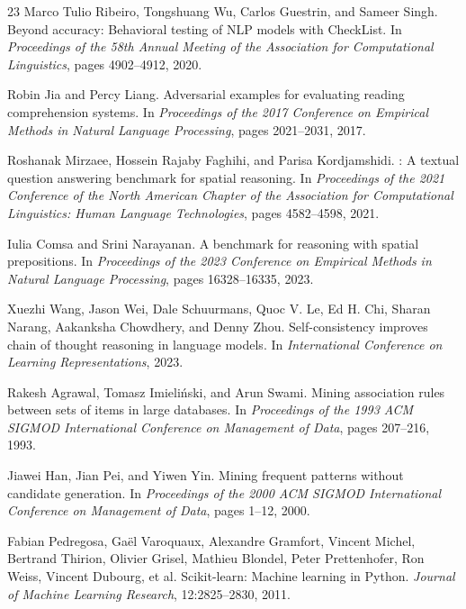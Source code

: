 \begin{thebibliography}{23}
Marco Tulio Ribeiro, Tongshuang Wu, Carlos Guestrin, and Sameer Singh.
\newblock Beyond accuracy: Behavioral testing of NLP models with CheckList.
\newblock In \emph{Proceedings of the 58th Annual Meeting of the Association for Computational Linguistics}, pages 4902--4912, 2020.

Robin Jia and Percy Liang.
\newblock Adversarial examples for evaluating reading comprehension systems.
\newblock In \emph{Proceedings of the 2017 Conference on Empirical Methods in Natural Language Processing}, pages 2021--2031, 2017.

Roshanak Mirzaee, Hossein Rajaby Faghihi, and Parisa Kordjamshidi.
: A textual question answering benchmark for spatial reasoning.
\newblock In \emph{Proceedings of the 2021 Conference of the North American Chapter of the Association for Computational Linguistics: Human Language Technologies}, pages 4582--4598, 2021.

Iulia Comsa and Srini Narayanan.
\newblock A benchmark for reasoning with spatial prepositions.
\newblock In \emph{Proceedings of the 2023 Conference on Empirical Methods in Natural Language Processing}, pages 16328--16335, 2023.

Xuezhi Wang, Jason Wei, Dale Schuurmans, Quoc V. Le, Ed H. Chi, Sharan Narang, Aakanksha Chowdhery, and Denny Zhou.
\newblock Self-consistency improves chain of thought reasoning in language models.
\newblock In \emph{International Conference on Learning Representations}, 2023.

Rakesh Agrawal, Tomasz Imieli{\'n}ski, and Arun Swami.
\newblock Mining association rules between sets of items in large databases.
\newblock In \emph{Proceedings of the 1993 ACM SIGMOD International Conference on Management of Data}, pages 207--216, 1993.

Jiawei Han, Jian Pei, and Yiwen Yin.
\newblock Mining frequent patterns without candidate generation.
\newblock In \emph{Proceedings of the 2000 ACM SIGMOD International Conference on Management of Data}, pages 1--12, 2000.

Fabian Pedregosa, Ga{\"e}l Varoquaux, Alexandre Gramfort, Vincent Michel, Bertrand Thirion, Olivier Grisel, Mathieu Blondel, Peter Prettenhofer, Ron Weiss, Vincent Dubourg, et al.
\newblock Scikit-learn: Machine learning in {P}ython.
\newblock \emph{Journal of Machine Learning Research}, 12:2825--2830, 2011.


\end{thebibliography}
